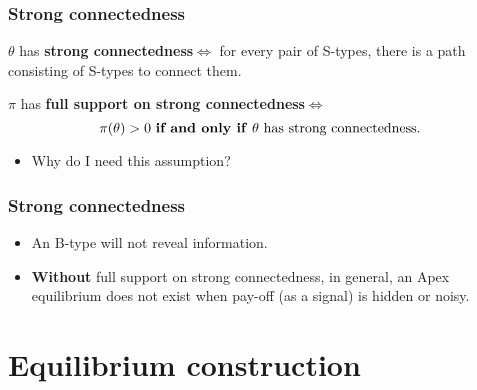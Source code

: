 \documentclass[8pt]{beamer}
\begin{document}
\begin{frame}
  \frametitle{Strong connectedness}


\begin{definition}
$\theta$ has \textbf{strong connectedness}$\Leftrightarrow$ for every pair of S-types, there is a path consisting of S-types to connect them.
\end{definition}  

\begin{definition}
$\pi$ has \textbf{full support on strong connectedness}$\Leftrightarrow$ 
\[\text{$\pi(\theta)>0$ \textbf{if and only if} $\theta$ has strong connectedness.}\]
\end{definition}  
\pause

\begin{itemize}
\item Why do I need this assumption?
\end{itemize}
\end{frame}


\begin{frame}
  \frametitle{Strong connectedness}

\begin{center}
\end{center}

\begin{itemize}


\item An B-type will not reveal information.
\item \textbf{Without} {full support on strong connectedness}, in general, an Apex equilibrium does not exist when pay-off (as a signal) is hidden or noisy.

\end{itemize}
\end{frame}




\section{Equilibrium construction}
\end{document}

